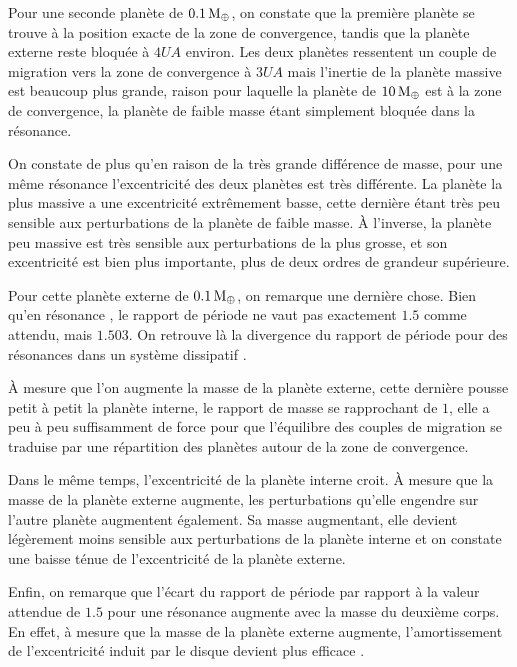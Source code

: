 Pour une seconde planète de $0.1\mathrm{\thinspace M_\oplus}$, on constate que la première planète se trouve à la position exacte de la
zone de convergence, tandis que la planète externe reste bloquée à $4\unit{UA}$ environ. Les deux planètes ressentent un couple
de
migration vers la zone de convergence à $3\unit{UA}$ mais l'inertie de la planète massive est beaucoup plus grande, raison pour
laquelle la planète de $10\mathrm{\thinspace M_\oplus}$ est à la zone de convergence, la planète de faible masse étant simplement bloquée dans la
résonance. 

On constate de plus qu'en raison de la très grande différence de masse, pour une même résonance l'excentricité des deux
planètes est très différente. La planète la plus massive a une excentricité extrêmement basse, cette dernière étant très peu
sensible aux perturbations de la planète de faible masse. À l'inverse, la planète peu massive est très sensible aux
perturbations de la plus grosse, et son excentricité est bien plus importante, plus de deux ordres de grandeur supérieure.

Pour cette planète externe de $0.1\mathrm{\thinspace M_\oplus}$, on remarque une dernière chose. Bien qu'en résonance , le rapport de période
ne vaut pas exactement $1.5$ comme attendu, mais $1.503$. On retrouve là la divergence du rapport de période pour des
résonances dans un système dissipatif \citep{batygin2013dissipative, baruteau2013disk}. 

\bigskip

À mesure que l'on augmente la masse de la planète externe, cette dernière pousse petit à petit la planète interne, le rapport
de masse se rapprochant de $1$, elle a peu à peu suffisamment de force pour que l'équilibre des couples de migration se
traduise par une répartition des planètes autour de la zone de convergence. 

Dans le même temps, l'excentricité de la planète interne croit. À mesure que la masse de la planète externe augmente, les
perturbations qu'elle engendre sur l'autre planète augmentent également. Sa masse augmentant, elle devient légèrement moins
sensible aux perturbations de la planète interne et on constate une baisse ténue de l'excentricité de la planète externe. 

Enfin, on remarque que l'écart du rapport de période par rapport à la valeur attendue de $1.5$ pour une résonance 
augmente avec la masse du deuxième corps. En effet, à mesure que la masse de la planète externe augmente, l'amortissement de
l'excentricité induit par le disque devient plus efficace \citep[eq. (9)]{cresswell2008three}. 

